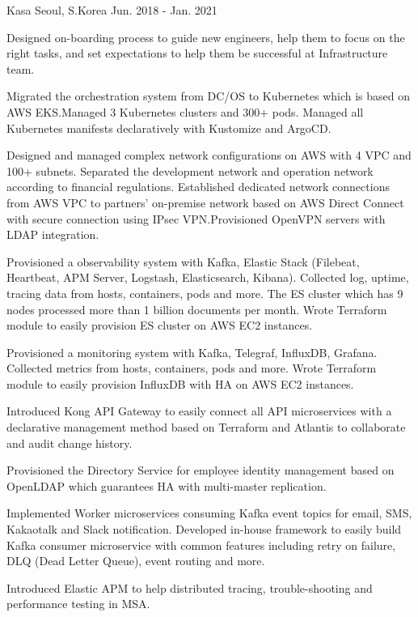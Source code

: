 \begin{cventries}
	{Kasa} %
	{Seoul, S.Korea} %
	{Jun. 2018 - Jan. 2021} %
	{
		\begin{cvitems} %
			\item {Designed on-boarding process to guide new engineers, help them to focus on the right tasks, and set expectations to help them be successful at Infrastructure team.}
			\item {Migrated the orchestration system from DC/OS to Kubernetes which is based on AWS EKS.\@ Managed 3 Kubernetes clusters and 300+ pods. Managed all Kubernetes manifests declaratively with Kustomize and ArgoCD.}
			\item {Designed and managed complex network configurations on AWS with 4 VPC and 100+ subnets. Separated the development network and operation network according to financial regulations. Established dedicated network connections from AWS VPC to partners' on-premise network based on AWS Direct Connect with secure connection using IPsec VPN.\@ Provisioned OpenVPN servers with LDAP integration.}
			\item {Provisioned a observability system with Kafka, Elastic Stack (Filebeat, Heartbeat, APM Server, Logstash, Elasticsearch, Kibana). Collected log, uptime, tracing data from hosts, containers, pods and more. The ES cluster which has 9 nodes processed more than 1 billion documents per month. Wrote Terraform module to easily provision ES cluster on AWS EC2 instances.}
			\item {Provisioned a monitoring system with Kafka, Telegraf, InfluxDB, Grafana. Collected metrics from hosts, containers, pods and more. Wrote Terraform module to easily provision InfluxDB with HA on AWS EC2 instances.}
			\item {Introduced Kong API Gateway to easily connect all API microservices with a declarative management method based on Terraform and Atlantis to collaborate and audit change history.}
			\item {Provisioned the Directory Service for employee identity management based on OpenLDAP which guarantees HA with multi-master replication.}
			\item {Implemented Worker microservices consuming Kafka event topics for email, SMS, Kakaotalk and Slack notification. Developed in-house framework to easily build Kafka consumer microservice with common features including retry on failure, DLQ (Dead Letter Queue), event routing and more.}
			\item {Introduced Elastic APM to help distributed tracing, trouble-shooting and performance testing in MSA.}
		\end{cvitems}
	}


\end{cventries}
